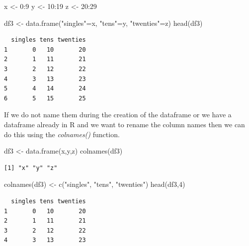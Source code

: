 \documentclass[
  letterpaper,
  DIV=11,
  numbers=noendperiod]{scrreprt}
\newenvironment{Shaded}{\begin{snugshade}}{\end{snugshade}}
\newcommand{\DecValTok}[1]{\textcolor[rgb]{0.68,0.00,0.00}{#1}}
\newcommand{\FunctionTok}[1]{\textcolor[rgb]{0.28,0.35,0.67}{#1}}
\newcommand{\NormalTok}[1]{\textcolor[rgb]{0.00,0.23,0.31}{#1}}
\newcommand{\OtherTok}[1]{\textcolor[rgb]{0.00,0.23,0.31}{#1}}
\newcommand{\SpecialCharTok}[1]{\textcolor[rgb]{0.37,0.37,0.37}{#1}}
\newcommand{\StringTok}[1]{\textcolor[rgb]{0.13,0.47,0.30}{#1}}
\begin{document}
\begin{Shaded}
\begin{Highlighting}[]
\NormalTok{x }\OtherTok{\textless{}{-}} \DecValTok{0}\SpecialCharTok{:}\DecValTok{9}
\NormalTok{y }\OtherTok{\textless{}{-}} \DecValTok{10}\SpecialCharTok{:}\DecValTok{19}
\NormalTok{z }\OtherTok{\textless{}{-}} \DecValTok{20}\SpecialCharTok{:}\DecValTok{29}

\NormalTok{df3 }\OtherTok{\textless{}{-}} \FunctionTok{data.frame}\NormalTok{(}\StringTok{"singles"}\OtherTok{=}\NormalTok{x, }\StringTok{"tens"}\OtherTok{=}\NormalTok{y, }\StringTok{"twenties"}\OtherTok{=}\NormalTok{z)}
\FunctionTok{head}\NormalTok{(df3)}
\end{Highlighting}
\end{Shaded}

\begin{verbatim}
  singles tens twenties
1       0   10       20
2       1   11       21
3       2   12       22
4       3   13       23
5       4   14       24
6       5   15       25
\end{verbatim}

If we do not name them during the creation of the dataframe or we have a
dataframe already in R and we want to rename the column names then we
can do this using the \emph{colnames()} function.

\begin{Shaded}
\begin{Highlighting}[]
\NormalTok{df3 }\OtherTok{\textless{}{-}} \FunctionTok{data.frame}\NormalTok{(x,y,z)}
\FunctionTok{colnames}\NormalTok{(df3)}
\end{Highlighting}
\end{Shaded}

\begin{verbatim}
[1] "x" "y" "z"
\end{verbatim}

\begin{Shaded}
\begin{Highlighting}[]
\FunctionTok{colnames}\NormalTok{(df3) }\OtherTok{\textless{}{-}} \FunctionTok{c}\NormalTok{(}\StringTok{"singles"}\NormalTok{, }\StringTok{"tens"}\NormalTok{, }\StringTok{"twenties"}\NormalTok{)}
\FunctionTok{head}\NormalTok{(df3,}\DecValTok{4}\NormalTok{)}
\end{Highlighting}
\end{Shaded}

\begin{verbatim}
  singles tens twenties
1       0   10       20
2       1   11       21
3       2   12       22
4       3   13       23
\end{verbatim}
\end{document}
